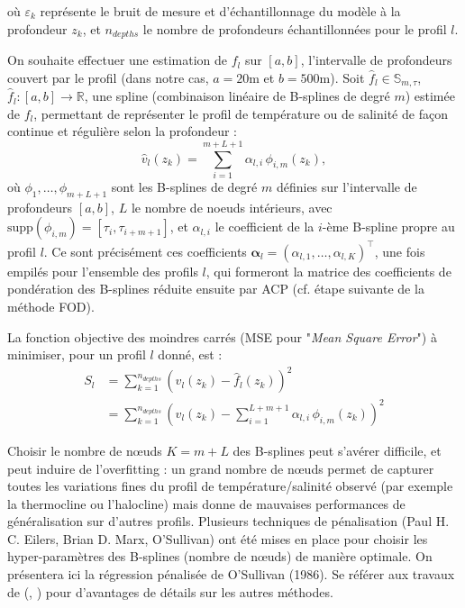 \documentclass{article}
\begin{document}
	où $\varepsilon_k$ représente le bruit de mesure et d'échantillonnage du modèle à la profondeur $z_k$, et $n_{depths}$ le nombre de profondeurs échantillonnées pour le profil $l$.
	
	On souhaite effectuer une estimation de $f_l$ sur $[a, b]$, l'intervalle de profondeurs couvert par le profil (dans notre cas, $a=20$m et $b=500$m). Soit $\hat f_l \in \mathbb{S}_{m, \tau}$, $\hat f_l : [a, b] \rightarrow \mathbb{R}$, une spline (combinaison linéaire de B-splines de degré $m$) estimée de $f_l$, permettant de représenter le profil de température ou de salinité de façon continue et régulière selon la profondeur :
	\begin{equation}
		\hat v_l(z_k) = \sum_{i=1}^{m+L+1} \alpha_{l,i}\, \phi_{i,m}(z_k),
	\end{equation}
	où $\phi_1, \ldots, \phi_{m+L+1}$ sont les B-splines de degré $m$ définies sur l'intervalle de profondeurs $[a,b]$, $L$ le nombre de noeuds intérieurs, avec $\text{supp}(\phi_{i,m}) = [\tau_i, \tau_{i+m+1}]$, et $\alpha_{l,i}$ le coefficient de la $i$-ème B-spline propre au profil $l$. Ce sont précisément ces coefficients $\boldsymbol{\alpha}_l = (\alpha_{l,1}, \ldots, \alpha_{l,K})^\top$, une fois empilés pour l'ensemble des profils $l$, qui formeront la matrice des coefficients de pondération des B-splines réduite ensuite par ACP (cf. étape suivante de la méthode FOD).
	
	La fonction objective des moindres carrés (MSE pour "\textit{Mean Square Error}") à minimiser, pour un profil $l$ donné, est :
	\begin{align}
		S_l &= \sum_{k=1}^{n_{depths}} \left(v_l(z_k) - \hat f_l(z_k)\right)^{2} \\
		&= \sum_{k=1}^{n_{depths}} \left(v_l(z_k) - \sum_{i=1}^{L+m+1} 
		\alpha_{l,i}\, \phi_{i,m}(z_k)\right)^{2}
	\end{align}
	
	Choisir le nombre de nœuds $K = m+L$ des B-splines peut s'avérer difficile, et peut induire de l'overfitting : un grand nombre de nœuds permet de capturer toutes les variations fines du profil de température/salinité observé (par exemple la thermocline ou l'halocline) mais donne de mauvaises performances de généralisation sur d'autres profils. Plusieurs techniques de pénalisation (Paul H. C. Eilers, Brian D. Marx, O'Sullivan) ont été mises en place pour choisir les hyper-paramètres des B-splines (nombre de nœuds) de manière optimale. On présentera ici la régression pénalisée de O'Sullivan (1986). Se référer aux travaux de (\cite{wand2008}, \cite{eilers1996}) pour d'avantages de détails sur les autres méthodes.\\
	
\end{document}
